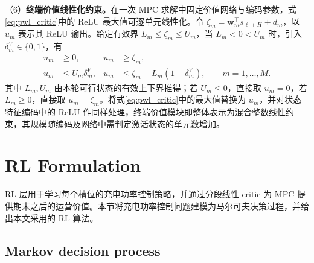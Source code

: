 \documentclass[12pt,a4paper,UTF8]{ctexart}
\begin{document}
（6）\textbf{终端价值线性化约束。}在一次 MPC 求解中固定价值网络与编码参数，式\eqref{eq:pwl_critic}中的 ReLU 最大值可逐单元线性化。令 $\zeta_m=\boldsymbol w_m^\top s_{\ell+H}+d_m$，以 $u_m$ 表示其 ReLU 输出。给定有效界 $L_m\le\zeta_m\le U_m$，当 $L_m<0<U_m$ 时，引入 $\delta_m^V\in\{0,1\}$，有
\begin{subequations}
\label{eq:pwl_critic_embedding}
\begin{align}
u_m&\ge0,& u_m&\ge\zeta_m,\\
u_m&\le U_m\delta_m^V,&
u_m&\le\zeta_m-L_m(1-\delta_m^V),
\qquad m=1,\ldots,M.
\end{align}
\end{subequations}
其中 $L_m,U_m$ 由本轮可行状态的有效上下界推得；若 $U_m\le0$，直接取 $u_m=0$，若 $L_m\ge0$，直接取 $u_m=\zeta_m$。将式\eqref{eq:pwl_critic}中的最大值替换为 $u_m$，并对状态特征编码中的 ReLU 作同样处理，终端价值模块即整体表示为混合整数线性约束，其规模随编码及网络中需判定激活状态的单元数增加。



\section{RL Formulation}

RL 层用于学习每个槽位的充电功率控制策略，并通过分段线性 critic 为 MPC 提供期末之后的运营价值。本节将充电功率控制问题建模为马尔可夫决策过程，并给出本文采用的 RL 算法。

\subsection{Markov decision process}
\end{document}
